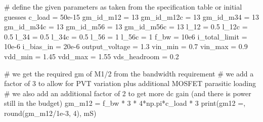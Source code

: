 \documentclass[
  a4paper,
  DIV=11,
  numbers=noendperiod]{scrartcl}
\newenvironment{Shaded}{\begin{snugshade}}{\end{snugshade}}
\newcommand{\BuiltInTok}[1]{\textcolor[rgb]{0.00,0.23,0.31}{#1}}
\newcommand{\CommentTok}[1]{\textcolor[rgb]{0.37,0.37,0.37}{#1}}
\newcommand{\DecValTok}[1]{\textcolor[rgb]{0.68,0.00,0.00}{#1}}
\newcommand{\FloatTok}[1]{\textcolor[rgb]{0.68,0.00,0.00}{#1}}
\newcommand{\NormalTok}[1]{\textcolor[rgb]{0.00,0.23,0.31}{#1}}
\newcommand{\OperatorTok}[1]{\textcolor[rgb]{0.37,0.37,0.37}{#1}}
\newcommand{\StringTok}[1]{\textcolor[rgb]{0.13,0.47,0.30}{#1}}
\begin{document}
\begin{tcolorbox}
\begin{Shaded}
\begin{Highlighting}[]
\CommentTok{\# define the given parameters as taken from the specification table or initial guesses}
\NormalTok{c\_load }\OperatorTok{=} \FloatTok{50e{-}15}
\NormalTok{gm\_id\_m12 }\OperatorTok{=} \DecValTok{13}
\NormalTok{gm\_id\_m12c }\OperatorTok{=} \DecValTok{13}
\NormalTok{gm\_id\_m34 }\OperatorTok{=} \DecValTok{13}
\NormalTok{gm\_id\_m34c }\OperatorTok{=} \DecValTok{13}
\NormalTok{gm\_id\_m56 }\OperatorTok{=} \DecValTok{13}
\NormalTok{gm\_id\_m56c }\OperatorTok{=} \DecValTok{13}
\NormalTok{l\_12 }\OperatorTok{=} \FloatTok{0.5}
\NormalTok{l\_12c }\OperatorTok{=} \FloatTok{0.5}
\NormalTok{l\_34 }\OperatorTok{=} \FloatTok{0.5}
\NormalTok{l\_34c }\OperatorTok{=} \FloatTok{0.5}
\NormalTok{l\_56 }\OperatorTok{=} \DecValTok{1}
\NormalTok{l\_56c }\OperatorTok{=} \DecValTok{1}
\NormalTok{f\_bw }\OperatorTok{=} \FloatTok{10e6}
\NormalTok{i\_total\_limit }\OperatorTok{=} \FloatTok{10e{-}6}
\NormalTok{i\_bias\_in }\OperatorTok{=} \FloatTok{20e{-}6}
\NormalTok{output\_voltage }\OperatorTok{=} \FloatTok{1.3}
\NormalTok{vin\_min }\OperatorTok{=} \FloatTok{0.7}
\NormalTok{vin\_max }\OperatorTok{=} \FloatTok{0.9}
\NormalTok{vdd\_min }\OperatorTok{=} \FloatTok{1.45}
\NormalTok{vdd\_max }\OperatorTok{=} \FloatTok{1.55}
\NormalTok{vds\_headroom }\OperatorTok{=} \FloatTok{0.2}
\end{Highlighting}
\end{Shaded}

\begin{Shaded}
\begin{Highlighting}[]
\CommentTok{\# we get the required gm of M1/2 from the bandwidth requirement}
\CommentTok{\# we add a factor of 3 to allow for PVT variation plus additional MOSFET parasitic loading}
\CommentTok{\# we also add an additional factor of 2 to get more dc gain (and there is power still in the budget)}
\NormalTok{gm\_m12 }\OperatorTok{=}\NormalTok{ f\_bw }\OperatorTok{*} \DecValTok{3} \OperatorTok{*} \DecValTok{4}\OperatorTok{*}\NormalTok{np.pi}\OperatorTok{*}\NormalTok{c\_load }\OperatorTok{*} \DecValTok{3}
\BuiltInTok{print}\NormalTok{(}\StringTok{\textquotesingle{}gm12 =\textquotesingle{}}\NormalTok{, }\BuiltInTok{round}\NormalTok{(gm\_m12}\OperatorTok{/}\FloatTok{1e{-}3}\NormalTok{, }\DecValTok{4}\NormalTok{), }\StringTok{\textquotesingle{}mS\textquotesingle{}}\NormalTok{)}
\end{Highlighting}
\end{Shaded}


\end{tcolorbox}
\end{document}
